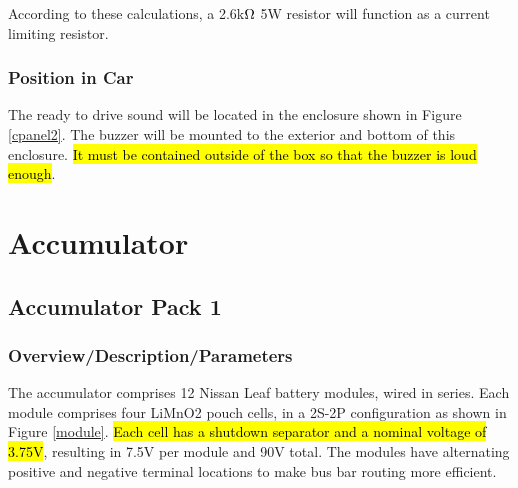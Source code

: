 \documentclass{article}
\DeclareRobustCommand{\hlr}[1]{{\sethlcolor{red}\hl{#1}}}
\begin{document}
            According to these calculations, a 2.6k$\ohm$ 5W resistor will function as a current limiting resistor.

        \subsubsection{Position in Car}

            The ready to drive sound will be located in the enclosure shown in Figure \ref{cpanel2}. The buzzer will be mounted to the exterior and bottom of this enclosure. \hlr{It must be contained outside of the box so that the buzzer is loud enough}.

\newpage

\section{Accumulator}

    \subsection{Accumulator Pack 1} \label{Battery1}

        \subsubsection{Overview/Description/Parameters} \label{batteryoverview}


            The accumulator comprises 12 Nissan Leaf battery modules, wired in series. Each module comprises four LiMnO2 pouch cells, in a 2S-2P configuration as shown in Figure \ref{module}. \hlr{Each cell has a shutdown separator and a nominal voltage of 3.75V}, resulting in 7.5V per module and 90V total. The modules have alternating positive and negative terminal locations to make bus bar routing more efficient.
\end{document}
